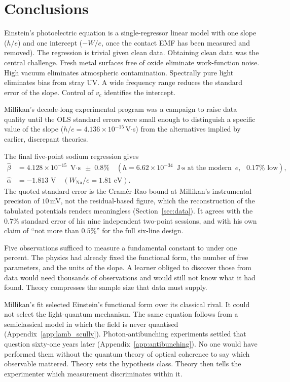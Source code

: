\documentclass[12pt]{article}
\begin{document}
\section{Conclusions}
\label{sec:conclusions}

Einstein's photoelectric equation is a single-regressor linear model with
one slope ($h/e$) and one intercept ($-W/e$, once the contact EMF has been
measured and removed).  The regression is trivial
given clean data.  Obtaining clean data was the central challenge.  Fresh
metal surfaces free of oxide eliminate work-function noise.  High vacuum
eliminates atmospheric contamination.  Spectrally pure light eliminates bias
from stray UV.  A wide frequency range reduces the standard error of the
slope.  Control of $v_c$ identifies the intercept.

Millikan's decade-long experimental program was a campaign to
raise data quality until the OLS standard errors were small enough to
distinguish a specific value of the slope ($h/e = 4.136\times10^{-15}$\,V$\cdot$s)
from the alternatives implied by earlier, discrepant theories.

The final five-point sodium regression gives
\begin{align*}
  \hat\beta &= 4.128\times10^{-15}\text{ V$\cdot$s} \;\pm\; 0.8\%
    \quad (h = 6.62\times10^{-34}\text{ J$\cdot$s at the modern }e,
    \text{ }0.17\%\text{ low}), \\
  \hat\alpha &= -1.813\text{ V}
             \quad (W_{\mathrm{Na}}/e = 1.81\text{ eV}).
\end{align*}
The quoted standard error is the Cram\'er-Rao bound at Millikan's
instrumental precision of $10$\,mV, not the residual-based figure, which the
reconstruction of the tabulated potentials renders meaningless
(Section~\ref{sec:data}).  It agrees with the $0.7\%$ standard error of his
nine independent two-point sessions, and with his own claim of ``not more
than $0.5\%$'' for the full six-line design.

Five observations sufficed to measure a fundamental constant to under one
percent.  The physics had already fixed the functional form, the number of
free parameters, and the units of the slope.  A learner obliged to discover
those from data would need thousands of observations and would still not know
what it had found.  Theory compresses the sample size that data must supply.

Millikan's fit selected Einstein's functional form over its classical rival.
It could not select the light-quantum mechanism.  The same equation follows
from a semiclassical model in which the field is never quantised
(Appendix~\ref{app:lamb_scully}).  Photon-antibunching experiments settled
that question sixty-one years later (Appendix~\ref{app:antibunching}).  No one
would have performed them without the quantum theory of optical coherence to
say which observable mattered.  Theory sets the hypothesis class.  Theory then
tells the experimenter which measurement discriminates within it.
\end{document}
